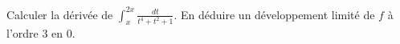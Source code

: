  Calculer la d{\'e}riv{\'e}e de $\int_{x}^{2x}\frac{dt}{t^{4}+t^{2}+1}$. En d{\'e}duire un d{\'e}veloppement limit{\'e} de $f$ {\`a} l'ordre 3 en 0.
\bigskip\bigskip 